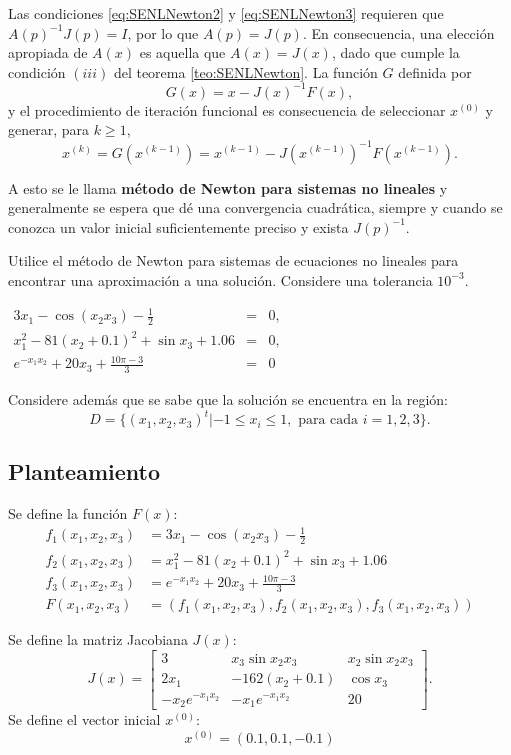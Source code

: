 Las condiciones \ref{eq:SENLNewton2} y \ref{eq:SENLNewton3} requieren que $A(p)^{-1}J(p) = I$, por lo que $A(p)=J(p)$. En
consecuencia, una elección apropiada de $A(x)$ es aquella que $A(x)=J(x)$, dado que cumple la condición $(iii)$ del teorema 
\ref{teo:SENLNewton}. La función $G$ definida por
\[
	G(x) = x - J(x)^{-1}F(x),
\]
y el procedimiento de iteración funcional es consecuencia de seleccionar $x^{(0)}$ y generar, para $k\geq 1$,
\[ 
	x^{(k)} = G\left(x^{(k-1)} \right) = x^{(k-1)} - J\left(x^{(k-1)}\right)^{-1}F\left(x^{(k-1)} \right).
\]

A esto se le llama \textbf{método de Newton para sistemas no lineales} y generalmente se espera que dé una convergencia 
cuadrática, siempre y cuando se conozca un valor inicial suficientemente preciso y exista $J(p)^{-1}$.

\begin{exerciseT}
Utilice el método de Newton para sistemas de ecuaciones no lineales para encontrar una aproximación a una solución. 
Considere una tolerancia $10^{-3}$.
\begin{center}
  $\begin{array}{rcl}
    3x_1 - \cos (x_2x_3) - \frac{1}{2} & = & 0,\\
    x_1^2 - 81(x_2 + 0.1)^2 + \sin x_3 + 1.06 & = & 0,\\
    e^{-x_1x_2} + 20x_3 + \frac{10\pi - 3}{3} & = & 0
  \end{array}$
\end{center}
Considere además que se sabe que la solución se encuentra en la región:
\[
	D=\{(x_1,x_2,x_3)^t | -1\leq x_i\leq 1, \mbox{ para cada } i=1,2,3\}.
\]

\subsection*{Planteamiento}
Se define la función $F(x)$:
\begin{align*}
	f_1(x_1,x_2,x_3) &= 3x_1 - \cos (x_2x_3) - \frac{1}{2} \\
	f_2(x_1,x_2,x_3) &= x_1^2 - 81(x_2 + 0.1)^2 + \sin x_3 + 1.06 \\
	f_3(x_1,x_2,x_3) &= e^{-x_1x_2} + 20x_3 + \frac{10\pi - 3}{3} \\
	F(x_1,x_2,x_3) &= \left(f_1(x_1,x_2,x_3), f_2(x_1,x_2,x_3), f_3(x_1,x_2,x_3) \right) 
\end{align*}

Se define la matriz Jacobiana $J(x)$:
\[
	J(x) = 
	\left[
	\begin{matrix}
		3 & x_3\sin x_2x_3 & x_2\sin x_2x_3 \\
		2x_1 & -162(x_2+0.1) & \cos x_3\\
		-x_2e^{-x_1x_2} & -x_1e^{-x_1x_2} & 20
	\end{matrix}
	\right].
\]
Se define el vector inicial $x^{(0)}$:
\[
	x^{(0)} = (0.1, 0.1, -0.1)
\]


\end{exerciseT}

